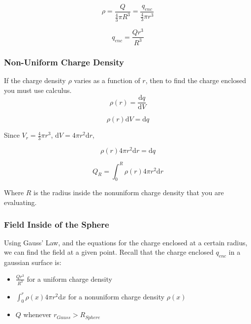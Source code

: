 \documentclass[a4paper,12pt]{article}
\begin{document}
								\begin{equation*}
										\rho = \frac{Q}{\frac{4}{3}\pi R^{3}} = \frac{q_{enc}}{\frac{4}{3}\pi r^{3}}
								\end{equation*}

								\begin{equation*}
										q_{enc} = \frac{Qr^{3}}{R^{3}}
								\end{equation*}
						\subsubsection{Non-Uniform Charge Density}
								If the charge density $\rho$ varies as a function of $r$, then to find the charge enclosed you must use calculus.					
								\begin{equation*}
										\rho(r) = \frac{\mathrm{d}q}{\mathrm{d}V} 
								\end{equation*}

								\begin{equation*}
										\rho(r) \mathrm{d}V = \mathrm{d}q 
								\end{equation*}

								Since $V_{r} = \frac{4}{3}\pi r^{3}$, $\mathrm{d}V = 4 \pi r^{2} \mathrm{d}r$,

								\begin{equation*}
										\rho(r) 4 \pi r^{2} \mathrm{d}r = \mathrm{d}q
								\end{equation*}

								\begin{equation*}
										Q_{R} = \int_{0}^{R} \rho(r) 4 \pi r^{2} \mathrm{d}r 
								\end{equation*}

								Where $R$ is the radius inside the nonuniform charge density that you are evaluating.
						\subsubsection{Field Inside of the Sphere}
								Using Gauss' Law, and the equations for the charge enclosed at a certain radius, we can find the field at a given point. Recall that the charge enclosed $q_{enc}$ in a gaussian surface is:
								\begin{itemize}
										\item $\frac{Qr^{3}}{R^{3}}$ for a uniform charge density
										\item $\int_{0}^{r} \rho(x) 4 \pi r^{2} \mathrm{d}x$ for a nonuniform charge density $\rho(x)$ 
										\item $Q$ whenever $r_{Gauss} > R_{Sphere}$
								\end{itemize}
\end{document}
